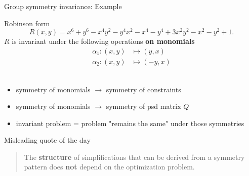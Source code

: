\begin{frame}{Group symmetry invariance: Example}
\vspace*{0.2in}
  \begin{block}{Robinson form}
      \[
      R(x,y) = x^6 + y^6 - x^4y^2 - y^4x^2 - x^4 - y^4  + 3x^2y^2 - x^2 - y^2 + 1.
      \]
  \vspace{-.1in}
      $R$ is invariant under the following operations \textbf{on monomials}
      \begin{align*}
        \alpha_1 \colon (x, y) & \mapsto (y, x)\\
        \alpha_2 \colon (x, y) & \mapsto (-y, x)
      \end{align*}
    \\[-0.6in]
    
  \end{block}
    \pause

  \begin{itemize}
    \item symmetry of monomials $\longrightarrow$ symmetry of constraints
    \item symmetry of monomials $\longrightarrow$ symmetry of psd matrix $Q$
    \item invariant problem = problem "remains the same" under those symmetries
  \end{itemize}
\end{frame}

\begin{frame}[standout]{Misleading quote of the day}
  
  \begin{quote}
    \noindent The \textbf{structure} of simplifications that can be derived from a symmetry pattern does \textbf{not} depend on the optimization problem.
  \end{quote}
  
\end{frame}

